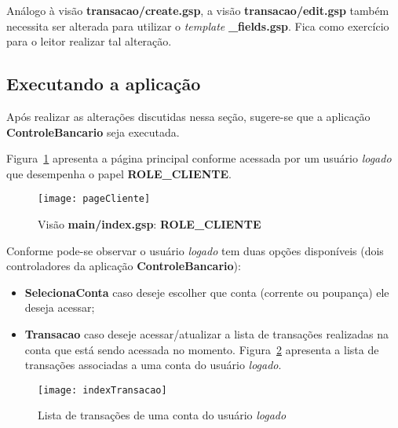 \begin{remark}
Análogo  à visão  {\bf transacao/create.gsp},  a visão  {\bf transacao/edit.gsp}
também   necessita  ser   alterada   para  utilizar   o   {\it  template}   {\bf
  \_fields.gsp}. Fica como exercício para o leitor realizar tal alteração.
\end{remark}

\subsection{Executando a aplicação}

\vspace{0.5cm}

Após realizar  as alterações discutidas  nessa seção, sugere-se que  a aplicação
{\bf ControleBancario} seja executada. 

\vspace{0.2cm}

Figura~\ref{figPageCliente} apresenta  a página principal  conforme acessada por
um usuário {\it logado} que desempenha o papel {\bf ROLE\_CLIENTE}. 

\begin{figure}[htbp]
\centering\texttt{[image: pageCliente]}
\caption{Visão {\bf main/index.gsp}: {\bf ROLE\_CLIENTE}}
\label{figPageCliente}
\end{figure}

Conforme pode-se  observar o  usuário {\it logado}  tem duas  opções disponíveis
(dois controladores da aplicação {\bf ControleBancario}):

\vspace{0.3cm}

\begin{itemize}

\item {\bf SelecionaConta} caso deseje escolher que conta (corrente ou poupança)
  ele deseja acessar;

\vspace{0.3cm}

\item  {\bf  Transacao} caso  deseje  acessar/atualizar  a  lista de  transações
  realizadas    na    conta    que    está   sendo    acessada    no    momento.
  Figura~\ref{indexTransacaoFig}  apresenta a lista  de transações  associadas a
  uma conta do usuário {\it logado}.  

\end{itemize}

\begin{figure}[htbp]
\centering\texttt{[image: indexTransacao]}
\caption{Lista de transações de uma conta do usuário {\it logado}}
\label{indexTransacaoFig}
\end{figure}

